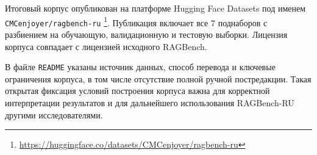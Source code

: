 Итоговый корпус опубликован на платформе Hugging Face Datasets под именем
\texttt{CMCenjoyer/ragbench-ru}
\footnote{\href{https://huggingface.co/datasets/CMCenjoyer/ragbench-ru}{https://huggingface.co/datasets/CMCenjoyer/ragbench-ru}}.
Публикация включает все 7 поднаборов с разбиением на обучающую, валидационную и
тестовую выборки. Лицензия корпуса совпадает с лицензией исходного RAGBench.

В файле \texttt{README} указаны источник данных, способ перевода и ключевые ограничения
корпуса, в том числе отсутствие полной ручной постредакции. Такая открытая фиксация
условий построения корпуса важна для корректной интерпретации результатов и для
дальнейшего использования RAGBench-RU другими исследователями.
